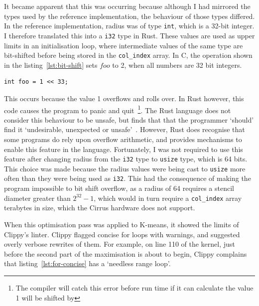 It became apparent that this was occurring because although I had mirrored the types used by the reference implementation, the behaviour of those types differed. In the reference implementation, radius was of type \texttt{int}, which is a 32-bit integer. I therefore translated this into a \texttt{i32} type in Rust. These values are used as upper limits in an initialisation loop, where intermediate values of the same type are bit-shifted before being stored in the \texttt{col\_index} array. In C, the operation shown in the listing~\ref{lst:bit-shift} sets $foo$ to 2, when all numbers are 32 bit integers. 

\begin{code}
\begin{verbatim}
int foo = 1 << 33;
\end{verbatim}
\label{lst:bit-shift}
\end{code}

This occurs because the value 1 overflows and rolls over. In Rust however, this code causes the program to panic and quit~\footnote{The compiler will catch this error before run time if it can calculate the value 1 will be shifted by}. The Rust language does not consider this behaviour to be unsafe, but finds that that the programmer `should' find it `undesirable, unexpected or unsafe'~\cite{rustunsafe}. However, Rust does recognise that some programs do rely upon overflow arithmetic, and provides mechanisms to enable this feature in the language. Fortunately, I was not required to use this feature after changing radius from the \texttt{i32} type to \texttt{usize} type, which is 64 bits. This choice was made because the radius values were being cast to \texttt{usize} more often than they were being used as \texttt{i32}. This had the consequence of making the program impossible to bit shift overflow, as a radius of 64 requires a stencil diameter greater than $2^{32}-1$, which would in turn require a \texttt{col\_index} array terabytes in size, which the Cirrus hardware does not support.

When this optimisation pass was applied to K-means, it showed the limits of Clippy's linter. Clippy flagged concise for loops with warnings, and suggested overly verbose rewrites of them. For example, on line 110 of the kernel, just before the second part of the maximisation is about to begin, Clippy complains that listing~\ref{lst:for-concise} has a `needless range loop'.

